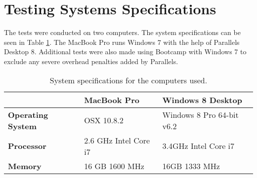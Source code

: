 \section{Testing Systems Specifications} \label{sec:system_specs}
The tests were conducted on two computers. The system specifications can be seen in Table \ref{table:system_specs}. The MacBook Pro runs Windows 7 with the help of Parallels Desktop 8. Additional tests were also made using Bootcamp with Windows 7 to exclude any severe overhead penalties added by Parallels.

\begin{table}[h]
	\begin{center}
		\begin{tabular} { m{4cm} | m{4cm}  | m{5cm} }
			\hline
			\textbf{} & \textbf{MacBook Pro} &
			\textbf{Windows 8 Desktop}  \\ \hline

			\textbf{Operating System}		& OSX 10.8.2
											& Windows 8 Pro 64-bit v6.2 \\ \hline

			\textbf{Processor}				& 2.6 GHz Intel Core i7
											& 3.4GHz Intel Core i7  \\ \hline

			\textbf{Memory}					& 16 GB 1600 MHz
											& 16GB 1333 MHz \\ \hline
		\end{tabular}
	\end{center}
	\caption{System specifications for the computers used.}
	\label{table:system_specs}
\end{table}
